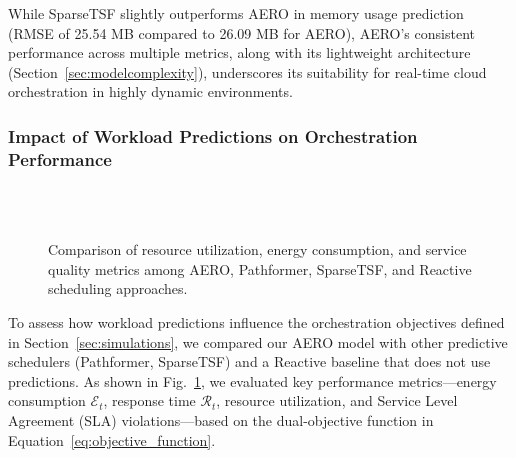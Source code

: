 \documentclass{ieeetmlcn}
\begin{document}
While SparseTSF slightly outperforms AERO in memory usage prediction (RMSE of 25.54 MB compared to 26.09 MB for AERO), AERO's consistent performance across multiple metrics, along with its lightweight architecture (Section~\ref{sec:modelcomplexity}), underscores its suitability for real-time cloud orchestration in highly dynamic environments.

\subsubsection{Impact of Workload Predictions on Orchestration Performance}

\begin{figure}\centering
\centering
    \hfill
    \\
    \hfill
    \\
    \hfill
    \caption{Comparison of resource utilization, energy consumption, and service quality metrics among AERO, Pathformer, SparseTSF, and Reactive scheduling approaches.}
    \label{fig:metrics_comparison}
\end{figure}

To assess how workload predictions influence the orchestration objectives defined in Section~\ref{sec:simulations}, we compared our AERO model with other predictive schedulers (Pathformer, SparseTSF) and a Reactive baseline that does not use predictions. As shown in Fig.~\ref{fig:metrics_comparison}, we evaluated key performance metrics—energy consumption $\mathcal{E}_t$, response time $\mathcal{R}_t$, resource utilization, and Service Level Agreement (SLA) violations—based on the dual-objective function in Equation~\eqref{eq:objective_function}.
\end{document}
